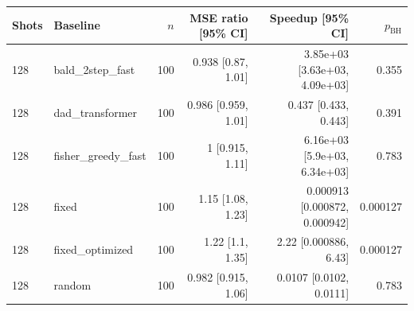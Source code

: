 \begin{tabular}{llrrrr}
\toprule
Shots & Baseline & $n$ & MSE ratio [95\% CI] & Speedup [95\% CI] & $p_{\mathrm{BH}}$ \\
\midrule
128 & bald\_2step\_fast & 100 & 0.938 [0.87, 1.01] & 3.85e+03 [3.63e+03, 4.09e+03] & 0.355 \\
128 & dad\_transformer & 100 & 0.986 [0.959, 1.01] & 0.437 [0.433, 0.443] & 0.391 \\
128 & fisher\_greedy\_fast & 100 & 1 [0.915, 1.11] & 6.16e+03 [5.9e+03, 6.34e+03] & 0.783 \\
128 & fixed & 100 & 1.15 [1.08, 1.23] & 0.000913 [0.000872, 0.000942] & 0.000127 \\
128 & fixed\_optimized & 100 & 1.22 [1.1, 1.35] & 2.22 [0.000886, 6.43] & 0.000127 \\
128 & random & 100 & 0.982 [0.915, 1.06] & 0.0107 [0.0102, 0.0111] & 0.783 \\
\bottomrule
\end{tabular}

